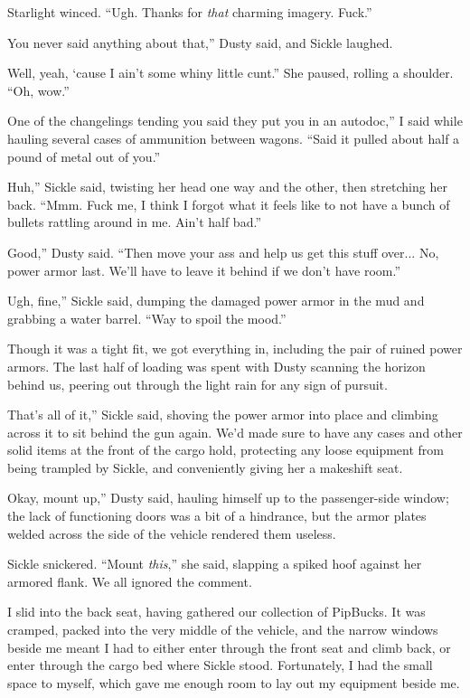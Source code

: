 Starlight winced. “Ugh. Thanks for \textit{that} charming imagery. Fuck.”

\leavevmode{}You never said anything about that,” Dusty said, and Sickle laughed.

\leavevmode{}Well, yeah, ‘cause I ain’t some whiny little cunt.” She paused, rolling a shoulder. “Oh, wow.”

\leavevmode{}One of the changelings tending you said they put you in an autodoc,” I said while hauling several cases of ammunition between wagons. “Said it pulled about half a pound of metal out of you.”

\leavevmode{}Huh,” Sickle said, twisting her head one way and the other, then stretching her back. “Mmm. Fuck me, I think I forgot what it feels like to not have a bunch of bullets rattling around in me. Ain’t half bad.”

\leavevmode{}Good,” Dusty said. “Then move your ass and help us get this stuff over... No, power armor last. We’ll have to leave it behind if we don’t have room.”

\leavevmode{}Ugh, fine,” Sickle said, dumping the damaged power armor in the mud and grabbing a water barrel. “Way to spoil the mood.”

Though it was a tight fit, we got everything in, including the pair of ruined power armors. The last half of loading was spent with Dusty scanning the horizon behind us, peering out through the light rain for any sign of pursuit.

\leavevmode{}That’s all of it,” Sickle said, shoving the power armor into place and climbing across it to sit behind the gun again. We’d made sure to have any cases and other solid items at the front of the cargo hold, protecting any loose equipment from being trampled by Sickle, and conveniently giving her a makeshift seat.

\leavevmode{}Okay, mount up,” Dusty said, hauling himself up to the passenger-side window; the lack of functioning doors was a bit of a hindrance, but the armor plates welded across the side of the vehicle rendered them useless.

Sickle snickered. “Mount \textit{this},” she said, slapping a spiked hoof against her armored flank. We all ignored the comment.

I slid into the back seat, having gathered our collection of PipBucks. It was cramped, packed into the very middle of the vehicle, and the narrow windows beside me meant I had to either enter through the front seat and climb back, or enter through the cargo bed where Sickle stood. Fortunately, I had the small space to myself, which gave me enough room to lay out my equipment beside me.

